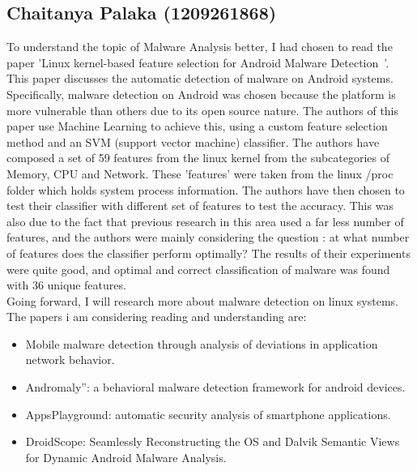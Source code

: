 \documentclass[11pt]{article}
\begin{document}
		\subsection{Chaitanya Palaka (1209261868)}
		To understand the topic of Malware Analysis better, I had chosen to read the paper 'Linux kernel-based feature selection for Android Malware Detection~\cite{kim2014linux}'. This paper discusses the automatic detection of malware on Android systems. Specifically, malware detection on Android was chosen because the platform is more vulnerable than others due to its open source nature. The authors of this paper use Machine Learning to achieve this, using a custom feature selection method and an SVM (support vector machine) classifier. The authors have composed a set of 59 features from the linux kernel from the subcategories of Memory, CPU and Network. These 'features' were taken from the linux /proc folder which holds system process information. The authors have then chosen to test their classifier with different set of features to test the accuracy. This was also due to the fact that previous research in this area used a far less number of features, and the authors were mainly considering the question : at what number of features does the classifier perform optimally? The results of their experiments were quite good, and optimal and correct classification of malware was found with 36 unique features.\\
		Going forward, I will research more about malware detection on linux systems. The papers i am considering reading and understanding are:
		\begin{itemize}[noitemsep]
			\item Mobile malware detection through analysis of deviations in application network behavior.~\cite{shabtai2014mobile}
			\item Andromaly”: a behavioral malware detection framework for android devices.~\cite{shabtai2012andromaly}
			\item AppsPlayground: automatic security analysis of smartphone applications.~\cite{rastogi2013appsplayground}
			\item DroidScope: Seamlessly Reconstructing the OS and Dalvik Semantic Views for Dynamic Android Malware Analysis.~\cite{yan2012droidscope}
		\end{itemize}
		
\end{document}
